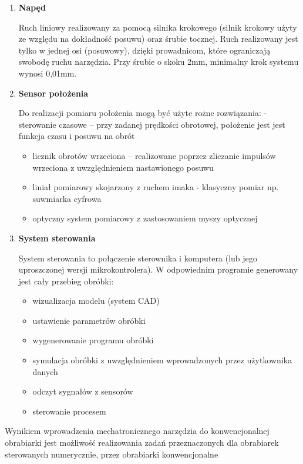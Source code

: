 \documentclass[13pt]{article}
\begin{document}
\begin{enumerate}


\item \textbf{Napęd}

Ruch liniowy realizowany za pomocą silnika krokowego (silnik krokowy użyty ze względu na dokładność posuwu) oraz śrubie tocznej. Ruch realizowany jest tylko w jednej osi (posuwowy), dzięki prowadnicom, które ograniczają swobodę ruchu narzędzia. Przy śrubie o skoku 2mm, minimalny krok systemu wynosi 0,01mm.
\item \textbf{Sensor położenia}

Do realizacji pomiaru położenia mogą być użyte rożne rozwiązania:
- sterowanie czasowe – przy zadanej prędkości obrotowej, położenie jest jest funkcja czasu i posuwu na obrót
\begin{itemize}
\item licznik obrotów wrzeciona – realizowane poprzez zliczanie impulsów wrzeciona z uwzględnieniem nastawionego posuwu
\item liniał pomiarowy skojarzony z ruchem imaka - klasyczny pomiar np. suwmiarka cyfrowa
\item optyczny system pomiarowy z zastosowaniem myszy optycznej
\end{itemize}

\item \textbf{System sterowania}

System sterowania to połączenie sterownika i komputera (lub jego uproszczonej wersji mikrokontrolera). W odpowiednim programie generowany jest cały przebieg obróbki:
\begin{itemize}
\item wizualizacja modelu (system CAD)
\item ustawienie parametrów obróbki
\item wygenerowanie programu obróbki
\item symulacja obróbki z uwzględnieniem wprowadzonych przez użytkownika danych
\item odczyt sygnałów z sensorów
\item sterowanie procesem
\end{itemize}

\end{enumerate}


	Wynikiem wprowadzenia mechatronicznego narzędzia do konwencjonalnej obrabiarki jest możliwość realizowania zadań przeznaczonych dla obrabiarek sterowanych numerycznie, przez obrabiarki konwencjonalne
\end{document}
